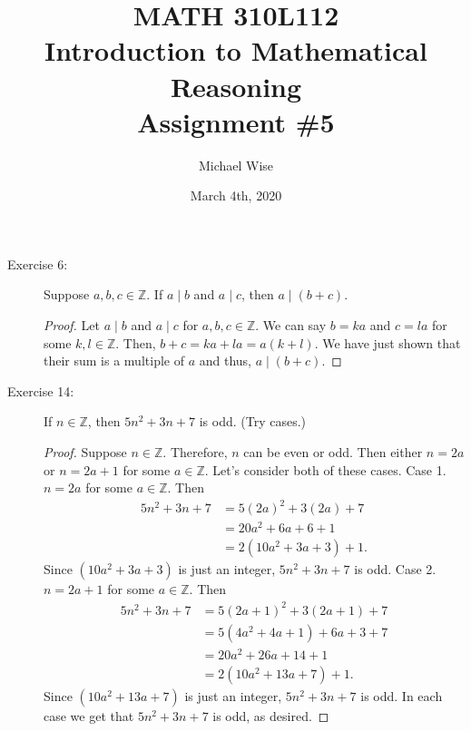\documentclass[12pt]{article}
\title{MATH 310L112\\
       Introduction to Mathematical Reasoning\\
       Assignment \#5}
\author{Michael Wise}
\date{March 4th, 2020}
\begin{document}
\maketitle
\begin{description}

\item[Exercise 6:] Suppose $a,b,c \in \mathbb{Z}$. If $a \mid b$ and $a \mid c$, then $a \mid (b + c)$.


\begin{spacing}{2}
\begin{proof}
Let $a \mid b$ and $a \mid c$ for $a,b,c \in \mathbb{Z}$. We can say $b=ka$ and $c=la$ for some $k,l \in \mathbb{Z}$. Then, $b + c = ka + la = a(k+l)$. We have just shown that their sum is a multiple of $a$ and thus, $a \mid (b + c)$.
\end{proof}
\end{spacing}
\vspace{.001in}
\item[Exercise 14:] If $n \in \mathbb{Z}$, then $5n^2 + 3n + 7$ is odd. (Try cases.)

\begin{spacing}{2}
\begin{proof}
Suppose $n \in \mathbb{Z}$. Therefore, $n$ can be even or odd. Then either $n=2a$ or $n=2a+1$ for some $a \in \mathbb{Z}$. Let's consider both of these cases.
\newline
Case 1. $n=2a$ for some $a \in \mathbb{Z}$. Then
\begin{align*}
5n^2 + 3n + 7 &= 5(2a)^2 + 3(2a) + 7 \\
&= 20a^2 + 6a + 6 + 1 \\
&= 2(10a^2 + 3a + 3) + 1.
\end{align*}
Since $(10a^2 + 3a + 3)$ is just an integer, $5n^2 + 3n + 7$ is odd.
\newline
Case 2. $n=2a+1$ for some $a \in \mathbb{Z}$. Then
\begin{align*}
5n^2 + 3n + 7 &= 5(2a+1)^2 + 3(2a+1) + 7 \\
&= 5(4a^2+4a+1) + 6a + 3 + 7 \\
&= 20a^2 + 26a + 14 + 1 \\
&= 2(10a^2 + 13a + 7) + 1.
\end{align*}
Since $(10a^2 + 13a + 7)$ is just an integer, $5n^2 + 3n + 7$ is odd.
\newline
In each case we get that $5n^2 + 3n + 7$ is odd, as desired.
\end{proof}
\end{spacing} 


\end{description}
\end{document}
